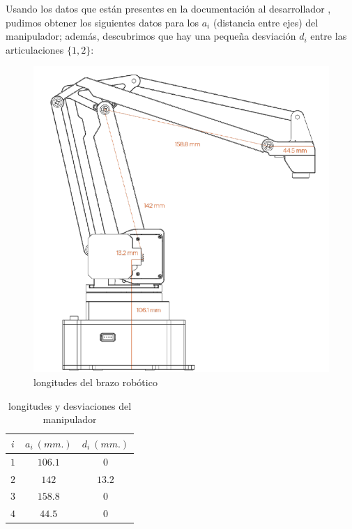 \documentclass[a4paper,12pt]{article}
\begin{document}
Usando los datos que están presentes en la documentación al desarrollador \cite{developer_guide_uarm},
pudimos obtener los siguientes datos para los $a_i$ (distancia entre ejes) del manipulador; además,
descubrimos que hay una pequeña desviación $d_i$ entre las articulaciones $\{1, 2\}$:

\begin{table}[ht]
    \begin{minipage}{.49\linewidth}
        \begin{figure}[H]
            \centering
            \includegraphics[width=\linewidth]{images/sizes.png}
            \caption{longitudes del brazo robótico \cite{developer_guide_uarm}}
            \label{fig:sizes}
        \end{figure}
    \end{minipage}
    \hfill
    \begin{minipage}{.49\linewidth}
        \centering
        \begin{tabular}{|| c | c c ||}
            \hline
            $i$ & $a_i~(mm.)$ & $d_i~(mm.)$ \\ [0.5ex]
            \hline\hline
            $1$ & $106.1$ & $0$ \\
            \hline
            $2$ & $142$ & $13.2$ \\
            \hline
            $3$ & $158.8$ & $0$ \\
            \hline
            $4$ & $44.5$ & $0$ \\ [1ex]
            \hline
        \end{tabular}
        \caption{longitudes y desviaciones del manipulador}
    \end{minipage}
\end{table}
\end{document}
